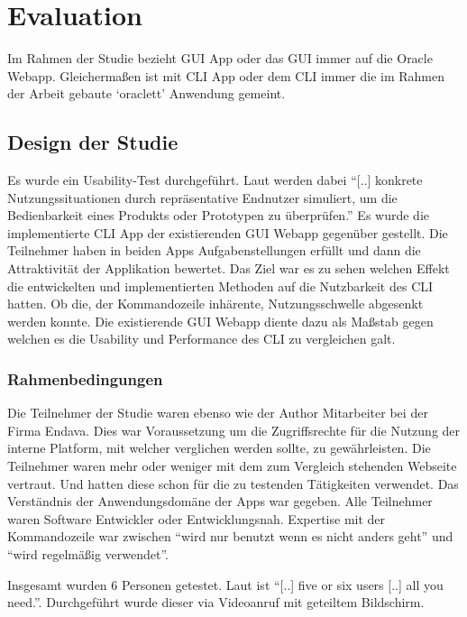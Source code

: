 \documentclass[oneside,bibliography=totocnumbered,BCOR=5mm]{scrbook}
\begin{document}
\chapter{Evaluation}
\label{sec:evaluation}

Im Rahmen der Studie bezieht GUI App oder das GUI immer auf die Oracle Webapp.
Gleichermaßen ist mit CLI App oder dem CLI immer die im Rahmen der Arbeit
gebaute `oraclett' Anwendung gemeint.

\section{Design der Studie}

Es wurde ein Usability-Test durchgeführt. Laut \cite[36]{hegner2003} werden
dabei ``[..] konkrete Nutzungssituationen durch repräsentative Endnutzer
simuliert, um die Bedienbarkeit eines Produkts oder Prototypen zu überprüfen.''
Es wurde die implementierte CLI App der existierenden GUI Webapp gegenüber
gestellt. Die Teilnehmer haben in beiden Apps Aufgabenstellungen erfüllt und
dann die Attraktivität der Applikation bewertet. Das Ziel war es zu sehen
welchen Effekt die entwickelten und implementierten Methoden auf die Nutzbarkeit
des CLI hatten. Ob die, der Kommandozeile inhärente, Nutzungsschwelle abgesenkt
werden konnte. Die existierende GUI Webapp diente dazu als Maßstab gegen welchen
es die Usability und Performance des CLI zu vergleichen galt.

\subsection{Rahmenbedingungen}

Die Teilnehmer der Studie waren ebenso wie der Author Mitarbeiter bei der
Firma Endava. Dies war Voraussetzung um die Zugriffsrechte für die Nutzung der
interne Platform, mit welcher verglichen werden sollte, zu gewährleisten. Die
Teilnehmer waren mehr oder weniger mit dem zum Vergleich stehenden Webseite
vertraut. Und hatten diese schon für die zu testenden Tätigkeiten verwendet. Das
Verständnis der Anwendungsdomäne der Apps war gegeben. Alle Teilnehmer waren
Software Entwickler oder Entwicklungsnah. Expertise mit der Kommandozeile war
zwischen ``wird nur benutzt wenn es nicht anders geht'' und ``wird regelmäßig
verwendet''.

Insgesamt wurden 6 Personen getestet. Laut \cite[11]{Spolsky_2001} ist ``[..]
five or six users [..] all you need.''. Durchgeführt wurde dieser via Videoanruf
mit geteiltem Bildschirm.
\end{document}
